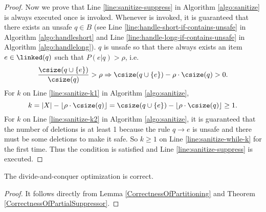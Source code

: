 \begin{proof}
Now we prove that Line \ref{line:sanitize-suppress} in Algorithm \ref{algo:sanitize}
  is always executed once \SanitizeBuffer is invoked.
Whenever \SanitizeBuffer is invoked, it is guaranteed that there exists
  an unsafe \qid $q\in B$ (see Line \ref{line:handle-short-if-contains-unsafe} in Algorithm \ref{algo:handleshort}
  and Line \ref{line:handle-long-if-contains-unsafe} in Algorithm \ref{algo:handlelong}).
$q$ is unsafe so that there always exists an item $e\in\linked(q)$ such that $P(e|q)>\rho$,
  i.e. \[ \frac{\csize(q\cup\{e\})}{\csize(q)}>\rho \Rightarrow \csize(q\cup\{e\})-\rho\cdot\csize(q)>0 .\]
For $k$ on Line \ref{line:sanitize-k1} in Algorithm \ref{algo:sanitize},
  \[ k = |X|-\lfloor\rho\cdot\csize(q)\rfloor = \csize(q\cup\{e\})-\lfloor\rho\cdot\csize(q)\rfloor \ge 1 .\]
For $k$ on Line \ref{line:sanitize-k2} in Algorithm \ref{algo:sanitize},
  it is guaranteed that the number of deletions is at least 1
  because the rule $q\rightarrow e$ is unsafe and there must be some deletions to make it safe.
So $k\ge 1$ on Line \ref{line:sanitize-while-k} for the first time.
Thus the condition is satisfied and Line \ref{line:sanitize-suppress} is executed.
\end{proof}

\begin{corollary}
The divide-and-conquer optimization \SplitData is correct.
\end{corollary}
\begin{proof}
It follows directly from Lemma \ref{CorrectnessOfPartitioning} and
Theorem \ref{CorrectnessOfPartialSuppressor}.
\end{proof}


